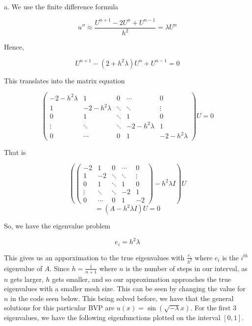 \begin{solution}\renewcommand{\qedsymbol}{}\ \\
    a. We use the finite difference formula

    $$u''\approx\frac{U^{n+1}-2U^n+U^{n-1}}{h^2}=\lambda U^n$$

    Hence,

    $$U^{n+1}-(2+h^2\lambda)U^n+U^{n-1}=0$$

    This translates into the matrix equation

    $$\left(\begin{array}{ccccc} -2-h^2\lambda & 1 & 0 & \cdots & 0
                              \\ 1 & -2-h^2\lambda & \ddots & \ddots & \vdots \\ 0 & 1 & \ddots & 1 & 0
                              \\ \vdots & \ddots & \ddots & -2-h^2\lambda & 1
                              \\ 0 & \cdots & 0 & 1 & -2-h^2\lambda\end{array}\right)U=0$$
    
    That is

    $$(\left(\begin{array}{ccccc} -2 & 1 & 0 & \cdots & 0 \\ 1 & -2 & \ddots & \ddots & \vdots
                                \\ 0 & 1 & \ddots & 1 & 0 \\ \vdots & \ddots & \ddots & -2 & 1
                                \\ 0 & \cdots & 0 & 1 & -2 \end{array}\right)-h^2\lambda I)U$$
    $$=(A-h^2\lambda I)U=0$$
    
    So, we have the eigenvalue problem

    $$e_i=h^2\lambda$$

    This gives us an apporximation to the true eigenvalues with $\frac{e_i}{h^2}$ where $e_i$ is the
    $i^{th}$ eigenvalue of $A$. Since $h=\frac{1}{n+1}$ where $n$ is the number of steps in our
    interval, as $n$ gets larger, $h$ gets smaller, and so our approximation approaches the true
    eigenvalues with a smaller mesh size. This can be seen by changing the value for $n$ in the code
    seen below. This being solved before, we have that the general solutions for this particular BVP
    are $u(x)=\sin(\sqrt{-\lambda}x)$. For the first 3 eigenvalues, we have the following eigenfunctions
    plotted on the interval $[0,1]$.
    

\end{solution}
